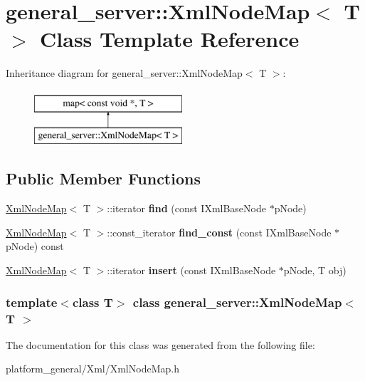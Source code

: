 \hypertarget{classgeneral__server_1_1XmlNodeMap}{\section{general\-\_\-server\-:\-:\-Xml\-Node\-Map$<$ \-T $>$ \-Class \-Template \-Reference}
\label{classgeneral__server_1_1XmlNodeMap}
}
\-Inheritance diagram for general\-\_\-server\-:\-:\-Xml\-Node\-Map$<$ \-T $>$\-:\begin{figure}[H]
\begin{center}
\leavevmode
\includegraphics[height=2.000000cm]{classgeneral__server_1_1XmlNodeMap}
\end{center}
\end{figure}
\subsection*{\-Public \-Member \-Functions}
\begin{DoxyCompactItemize}
\item 
\hypertarget{classgeneral__server_1_1XmlNodeMap_a23f5bee33c32e4b1bb6fdeafe7040afc}{\hyperlink{classgeneral__server_1_1XmlNodeMap}{\-Xml\-Node\-Map}$<$ \-T $>$\-::iterator {\bfseries find} (const \-I\-Xml\-Base\-Node $\ast$p\-Node)}\label{classgeneral__server_1_1XmlNodeMap_a23f5bee33c32e4b1bb6fdeafe7040afc}

\item 
\hypertarget{classgeneral__server_1_1XmlNodeMap_a9bbeb345c67b3d0c74f51758a6dfd4ec}{\hyperlink{classgeneral__server_1_1XmlNodeMap}{\-Xml\-Node\-Map}$<$ \-T $>$\-::const\-\_\-iterator {\bfseries find\-\_\-const} (const \-I\-Xml\-Base\-Node $\ast$p\-Node) const }\label{classgeneral__server_1_1XmlNodeMap_a9bbeb345c67b3d0c74f51758a6dfd4ec}

\item 
\hypertarget{classgeneral__server_1_1XmlNodeMap_ae1e1e76225f315d6b52633b7325130fe}{\hyperlink{classgeneral__server_1_1XmlNodeMap}{\-Xml\-Node\-Map}$<$ \-T $>$\-::iterator {\bfseries insert} (const \-I\-Xml\-Base\-Node $\ast$p\-Node, \-T obj)}\label{classgeneral__server_1_1XmlNodeMap_ae1e1e76225f315d6b52633b7325130fe}

\end{DoxyCompactItemize}
\subsubsection*{template$<$class \-T$>$ class general\-\_\-server\-::\-Xml\-Node\-Map$<$ T $>$}



\-The documentation for this class was generated from the following file\-:\begin{DoxyCompactItemize}
\item 
platform\-\_\-general/\-Xml/\-Xml\-Node\-Map.\-h\end{DoxyCompactItemize}
